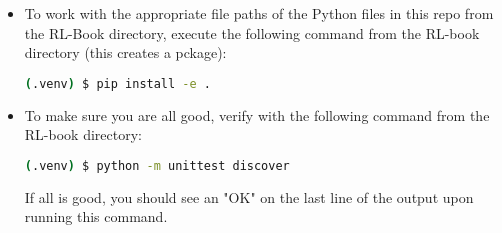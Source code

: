 \documentclass[12pt]{exam}
\begin{document}
\begin{questions}
\begin{itemize}
\begin{lstlisting}[language=bash]
(.venv) $ pip install -r requirements.txt
\end{lstlisting}
\item To work with the appropriate file paths of the Python files in this repo from the RL-Book directory, execute the following command from the RL-book directory (this creates a pckage):
\begin{lstlisting}[language=bash]
(.venv) $ pip install -e .
\end{lstlisting}
\item To make sure you are all good, verify with the following command from the RL-book directory:
\begin{lstlisting}[language=bash]
(.venv) $ python -m unittest discover
\end{lstlisting}
If all is good, you should see an "OK" on the last line of the output upon running this command.
\end{itemize}
\end{questions}
\end{document}
